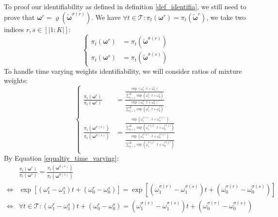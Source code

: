 To proof our identifiability as defined in definition \ref{def_identifia}, we still need to prove that $\boldsymbol{\omega}^r = \varrho(\tilde{\boldsymbol{\omega}}^{\sigma(r)})$.
We have $\forall t \in \mathcal{T}: \pi_t(\boldsymbol{\omega}^r) = \pi_t(\boldsymbol{\tilde{\omega}}^r)$, we take two indices $r,s \in [|1:K|]:$
\begin{equation}
\left\{ \begin{aligned}
    \pi_t(\boldsymbol{\omega}^r) &= \pi_t(\boldsymbol{\tilde{\omega}}^{\sigma(r)})\\
    \pi_t(\boldsymbol{\omega}^s) &= \pi_t(\boldsymbol{\tilde{\omega}}^{\sigma(s)})
\end{aligned}
    \right.
    \label{equaltiy_time_varying}
\end{equation}
To handle time varying weights identifiability, we will consider ratios of mixture weights:
\begin{equation*}
\left\{
\begin{aligned}
      \frac{\pi_t(\boldsymbol{\omega}^r)}{\pi_t(\boldsymbol{\omega}^s)}&=\frac{\frac{\exp \left(\omega^r_{1} \cdot t+\omega^r_{ 0}\right)}{\sum_{j=1}^{K} \exp \left(\omega^j_{1} \cdot t+\omega^j_{0}\right)}}{\frac{\exp \left(\omega^s_{1} \cdot t+\omega^s_{ 0}\right)}{\sum_{j=1}^{K} \exp \left(\omega^j_{1} \cdot t+\omega^j_{0}\right)}}\\
     \frac{\pi_t(\boldsymbol{\omega}^{\sigma(r)})}{\pi_t(\boldsymbol{\omega}^{\sigma(s)})}&=\frac{\frac{\exp \left(\omega^{\sigma(r)}_{1} \cdot t+\omega^{\sigma(r)}_{ 0}\right)}{\sum_{j=1}^{K} \exp \left(\omega^{\sigma(j)}_{1} \cdot t+\omega^{\sigma(j)}_{0}\right)}}{\frac{\exp \left(\omega^{\sigma(s)}_{1} \cdot t+\omega^{\sigma(s)}_{ 0}\right)}{\sum_{j=1}^{K} \exp \left(\omega^{\sigma(j)}_{1} \cdot t+\omega^{\sigma(j)}_{0}\right)}}\\
     \end{aligned}
    \right.
\end{equation*}
By Equation \ref{equaltiy_time_varying}:
\begin{equation*}
\begin{aligned}
      &\frac{\pi_t(\boldsymbol{\omega}^r)}{\pi_t(\boldsymbol{\omega}^s)} =\frac{\pi_t(\boldsymbol{\omega}^{\sigma(r)})}{\pi_t(\boldsymbol{\omega}^{\sigma(s)})}\\
     \Leftrightarrow& \exp \left[\left(\omega^r_{1}-\omega^s_{1}\right)t+\left(\omega^r_{ 0}-\omega^s_{ 0}\right) \right]=\exp \left[\left(\omega^{\sigma(r)}_{1}-\omega^{\sigma(s)}_{1}\right)t+\left(\omega^{\sigma(r)}_{0}-\omega^{\sigma(s)}_{0}\right) \right]\\
     \Leftrightarrow& \forall t \in \mathcal{T}: \left(\omega^r_{1}-\omega^s_{1}\right)t+\left(\omega^r_{ 0}-\omega^s_{ 0}\right) = \left(\omega^{\sigma(r)}_{1}-\omega^{\sigma(s)}_{1}\right)t+\left(\omega^{\sigma(r)}_{0}-\omega^{\sigma(s)}_{0}\right) 
     \end{aligned}
\end{equation*}
